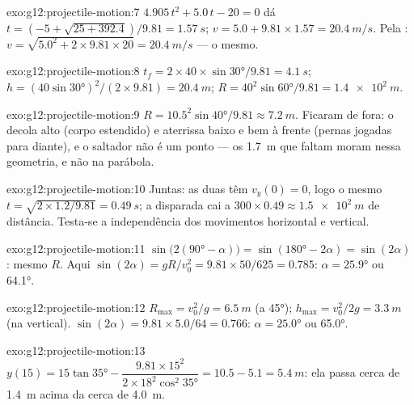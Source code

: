 \begin{solution}{exo:g12:projectile-motion:7}
$4.905\,t^2 + 5.0\,t - 20 = 0$ dá
$t = (-5 + \sqrt{25 + 392.4})/9.81 = \qty{1.57}{s}$;
$v = 5.0 + 9.81 \times 1.57 = \qty{20.4}{m/s}$. Pela :
$v = \sqrt{5.0^2 + 2 \times 9.81 \times 20} = \qty{20.4}{m/s}$ --- o
mesmo.
\end{solution}

\begin{solution}{exo:g12:projectile-motion:8}
$t_f = 2 \times 40 \times \sin\ang{30}/9.81 = \qty{4.1}{s}$;
$h = (40\sin\ang{30})^2/(2 \times 9.81) = \qty{20.4}{m}$;
$R = 40^2 \sin\ang{60}/9.81 = \qty{1.4e2}{m}$.
\end{solution}

\begin{solution}{exo:g12:projectile-motion:9}
$R = 10.5^2\sin\ang{40}/9.81 \approx \qty{7.2}{m}$. Ficaram de fora: o
 decola alto (corpo estendido) e aterrissa baixo e bem à
frente (pernas jogadas para diante), e o saltador não é um ponto --- os
\qty{1.7}{m} que faltam moram nessa geometria, e não na parábola.
\end{solution}

\begin{solution}{exo:g12:projectile-motion:10}
Juntas: as duas têm $v_y(0) = 0$, logo o mesmo
$t = \sqrt{2 \times 1.2/9.81} = \qty{0.49}{s}$; a disparada cai a
$300 \times 0.49 \approx \qty{1.5e2}{m}$ de distância. Testa-se a
independência dos movimentos horizontal e vertical.
\end{solution}

\begin{solution}{exo:g12:projectile-motion:11}
$\sin\bigl(2(\ang{90}-\alpha)\bigr) = \sin(\ang{180}-2\alpha) =
\sin(2\alpha)$: mesmo $R$. Aqui $\sin(2\alpha) = gR/v_0^2 =
9.81 \times 50/625 = 0.785$: $\alpha = \ang{25.9}$ ou \ang{64.1}.
\end{solution}

\begin{solution}{exo:g12:projectile-motion:12}
$R_{\max} = v_0^2/g = \qty{6.5}{m}$ (a \ang{45});
$h_{\max} = v_0^2/2g = \qty{3.3}{m}$ (na vertical).
$\sin(2\alpha) = 9.81 \times 5.0/64 = 0.766$: $\alpha = \ang{25.0}$ ou
\ang{65.0}.
\end{solution}

\begin{solution}{exo:g12:projectile-motion:13}
$y(15) = 15\tan\ang{35} - \dfrac{9.81 \times 15^2}
{2 \times 18^2 \cos^2\ang{35}} = 10.5 - 5.1 = \qty{5.4}{m}$: ela passa
cerca de \qty{1.4}{m} acima da cerca de \qty{4.0}{m}.
\end{solution}

